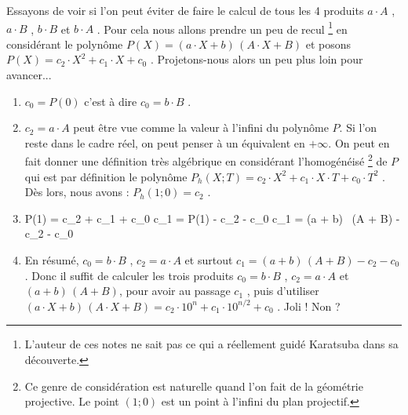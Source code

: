 \bigskip


Essayons de voir si l'on peut éviter de faire le calcul de tous les 4 produits $a \cdot A$ ,  $a \cdot B$ , $b \cdot B$ et $b \cdot A$ . 
Pour cela nous allons prendre un peu de recul
\footnote{
	L'auteur de ces notes ne sait pas ce qui a réellement guidé Karatsuba dans sa découverte.
}
en considérant le polynôme $P(X) = (a \cdot X + b) \, (A \cdot X + B)$ et posons $P(X) = c_2 \cdot X^2 + c_1 \cdot X + c_0$ . Projetons-nous alors un peu plus loin pour avancer...

\begin{enumerate}
	\item $c_0 = P(0)$ c'est à dire $c_0 = b \cdot B$ .

	
	\item $c_2 = a \cdot A$ peut être vue comme la valeur à l'infini du polynôme $P$. Si l'on reste dans le cadre réel, on peut penser à un équivalent en $+\infty$. On peut en fait donner une définition très algébrique en considérant l'homogénéisé
	\footnote{
		Ce genre de considération est naturelle quand l'on fait de la géométrie projective.
		Le point $(1 ; 0)$ est un point à l'infini du plan projectif.
	}
	de $P$ qui est par définition le polynôme $P_h(X ; T) = c_2 \cdot X^2 + c_1 \cdot X \cdot T + c_0 \cdot T^2$ .
	Dès lors, nous avons : $P_h(1 ; 0) = c_2$ .

	
	\item
	\begin{explain}[style = sar, ope = \iff]
		P(1) = c_2 + c_1 + c_0
			\explnext{}
		c_1 = P(1) - c_2 - c_0
			\explnext{}
		c_1 = (a + b) \, (A + B) - c_2 - c_0
	\end{explain}
	
	
	\item En résumé, 
	$c_0 = b \cdot B$ ,
	$c_2 = a \cdot A$
	et surtout 
	$c_1 = (a + b) \, (A + B) - c_2 - c_0$ .
	Donc il suffit de calculer les trois produits
	$c_0 = b \cdot B$ ,
	$c_2 = a \cdot A$
	et 
	$(a + b) \, (A + B)$,
	pour avoir au passage $c_1$ ,
	puis d'utiliser
	$(a \cdot X + b) \, (A \cdot X + B) %
	 = %
	 c_2 \cdot 10^n + c_1 \cdot 10^{n/2} + c_0$ .
	Joli ! Non ?
\end{enumerate}


